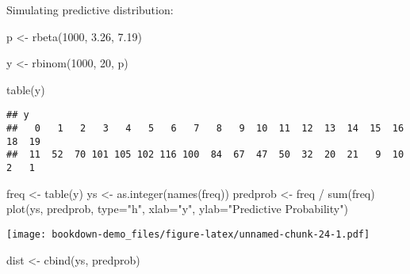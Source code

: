 \documentclass[
]{book}
\newenvironment{Shaded}{\begin{snugshade}}{\end{snugshade}}
\newcommand{\AttributeTok}[1]{\textcolor[rgb]{0.77,0.63,0.00}{#1}}
\newcommand{\DecValTok}[1]{\textcolor[rgb]{0.00,0.00,0.81}{#1}}
\newcommand{\FloatTok}[1]{\textcolor[rgb]{0.00,0.00,0.81}{#1}}
\newcommand{\FunctionTok}[1]{\textcolor[rgb]{0.00,0.00,0.00}{#1}}
\newcommand{\NormalTok}[1]{#1}
\newcommand{\OtherTok}[1]{\textcolor[rgb]{0.56,0.35,0.01}{#1}}
\newcommand{\SpecialCharTok}[1]{\textcolor[rgb]{0.00,0.00,0.00}{#1}}
\newcommand{\StringTok}[1]{\textcolor[rgb]{0.31,0.60,0.02}{#1}}
\begin{document}
Simulating predictive distribution:

\begin{Shaded}
\begin{Highlighting}[]
\NormalTok{p }\OtherTok{\textless{}{-}} \FunctionTok{rbeta}\NormalTok{(}\DecValTok{1000}\NormalTok{, }\FloatTok{3.26}\NormalTok{, }\FloatTok{7.19}\NormalTok{)}
\end{Highlighting}
\end{Shaded}

\begin{Shaded}
\begin{Highlighting}[]
\NormalTok{y }\OtherTok{\textless{}{-}} \FunctionTok{rbinom}\NormalTok{(}\DecValTok{1000}\NormalTok{, }\DecValTok{20}\NormalTok{, p)}
\end{Highlighting}
\end{Shaded}

\begin{Shaded}
\begin{Highlighting}[]
\FunctionTok{table}\NormalTok{(y)}
\end{Highlighting}
\end{Shaded}

\begin{verbatim}
## y
##   0   1   2   3   4   5   6   7   8   9  10  11  12  13  14  15  16  18  19 
##  11  52  70 101 105 102 116 100  84  67  47  50  32  20  21   9  10   2   1
\end{verbatim}

\begin{Shaded}
\begin{Highlighting}[]
\NormalTok{freq }\OtherTok{\textless{}{-}} \FunctionTok{table}\NormalTok{(y)}
\NormalTok{ys }\OtherTok{\textless{}{-}} \FunctionTok{as.integer}\NormalTok{(}\FunctionTok{names}\NormalTok{(freq))}
\NormalTok{predprob }\OtherTok{\textless{}{-}}\NormalTok{ freq }\SpecialCharTok{/} \FunctionTok{sum}\NormalTok{(freq)}
\FunctionTok{plot}\NormalTok{(ys, predprob, }\AttributeTok{type=}\StringTok{"h"}\NormalTok{, }\AttributeTok{xlab=}\StringTok{"y"}\NormalTok{,}
   \AttributeTok{ylab=}\StringTok{"Predictive Probability"}\NormalTok{)}
\end{Highlighting}
\end{Shaded}

\texttt{[image: bookdown-demo\_files/figure-latex/unnamed-chunk-24-1.pdf]}

\begin{Shaded}
\begin{Highlighting}[]
\NormalTok{dist }\OtherTok{\textless{}{-}} \FunctionTok{cbind}\NormalTok{(ys, predprob)}
\end{Highlighting}
\end{Shaded}
\end{document}
